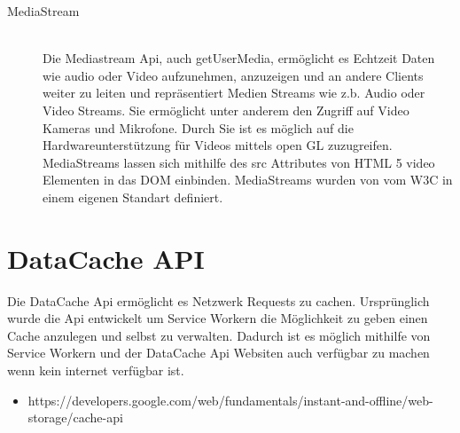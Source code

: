 \begin{description}



\item[MediaStream]\hfill \\
Die Mediastream Api, auch getUserMedia, ermöglicht es Echtzeit Daten wie audio oder Video aufzunehmen, anzuzeigen und an andere Clients weiter zu leiten und repräsentiert Medien Streams wie z.b. Audio oder Video Streams. Sie ermöglicht unter anderem den Zugriff auf Video Kameras und Mikrofone. Durch Sie ist es möglich auf die Hardwareunterstützung für Videos mittels open GL zuzugreifen. MediaStreams lassen sich mithilfe des src Attributes von HTML 5 video Elementen in das DOM einbinden. MediaStreams wurden von vom W3C in einem eigenen Standart definiert.\cite{w3MediaStream} 

\end{description}



\section{DataCache API}

Die DataCache Api ermöglicht es Netzwerk Requests zu cachen. Ursprünglich wurde die Api entwickelt um Service Workern die Möglichkeit zu geben einen Cache anzulegen und selbst zu verwalten. Dadurch ist es möglich mithilfe von Service Workern und der DataCache Api Websiten auch verfügbar zu machen wenn kein internet verfügbar ist. 

\begin{itemize}
	\item https://developers.google.com/web/fundamentals/instant-and-offline/web-storage/cache-api
\end{itemize}

